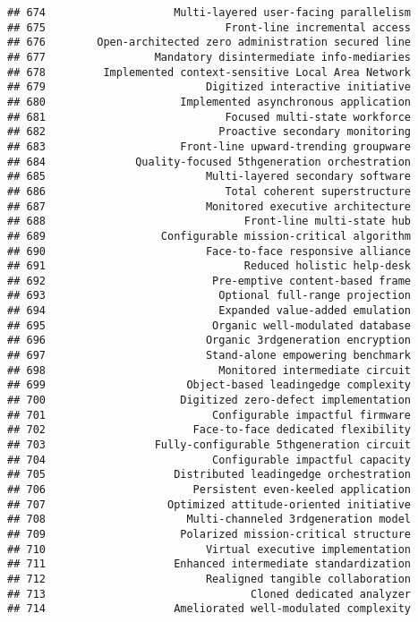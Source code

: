 \documentclass[
]{article}
\begin{document}
\begin{verbatim}
## 674                    Multi-layered user-facing parallelism
## 675                            Front-line incremental access
## 676        Open-architected zero administration secured line
## 677                 Mandatory disintermediate info-mediaries
## 678         Implemented context-sensitive Local Area Network
## 679                         Digitized interactive initiative
## 680                     Implemented asynchronous application
## 681                            Focused multi-state workforce
## 682                           Proactive secondary monitoring
## 683                     Front-line upward-trending groupware
## 684              Quality-focused 5thgeneration orchestration
## 685                         Multi-layered secondary software
## 686                            Total coherent superstructure
## 687                         Monitored executive architecture
## 688                               Front-line multi-state hub
## 689                  Configurable mission-critical algorithm
## 690                         Face-to-face responsive alliance
## 691                               Reduced holistic help-desk
## 692                          Pre-emptive content-based frame
## 693                           Optional full-range projection
## 694                           Expanded value-added emulation
## 695                          Organic well-modulated database
## 696                         Organic 3rdgeneration encryption
## 697                         Stand-alone empowering benchmark
## 698                           Monitored intermediate circuit
## 699                      Object-based leadingedge complexity
## 700                     Digitized zero-defect implementation
## 701                          Configurable impactful firmware
## 702                       Face-to-face dedicated flexibility
## 703                 Fully-configurable 5thgeneration circuit
## 704                          Configurable impactful capacity
## 705                    Distributed leadingedge orchestration
## 706                       Persistent even-keeled application
## 707                   Optimized attitude-oriented initiative
## 708                      Multi-channeled 3rdgeneration model
## 709                     Polarized mission-critical structure
## 710                         Virtual executive implementation
## 711                    Enhanced intermediate standardization
## 712                         Realigned tangible collaboration
## 713                                Cloned dedicated analyzer
## 714                    Ameliorated well-modulated complexity

\end{verbatim}
\end{document}
